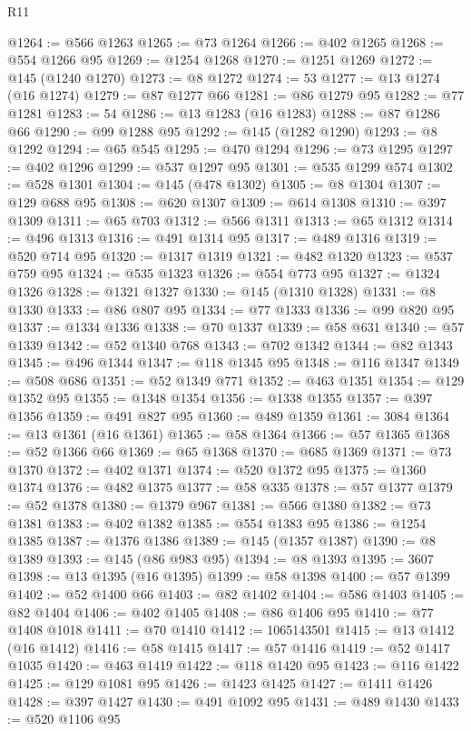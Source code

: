 \begin{lexlean}{R11}
\begin{coremodule}
@1264 := @566 @1263
@1265 := @73 @1264
@1266 := @402 @1265
@1268 := @554 @1266 @95
@1269 := @1254 @1268
@1270 := @1251 @1269
@1272 := @145 (@1240 @1270)
@1273 := @8 @1272
@1274 := 53
@1277 := @13 @1274 (@16 @1274)
@1279 := @87 @1277 @66
@1281 := @86 @1279 @95
@1282 := @77 @1281
@1283 := 54
@1286 := @13 @1283 (@16 @1283)
@1288 := @87 @1286 @66
@1290 := @99 @1288 @95
@1292 := @145 (@1282 @1290)
@1293 := @8 @1292
@1294 := @65 @545
@1295 := @470 @1294
@1296 := @73 @1295
@1297 := @402 @1296
@1299 := @537 @1297 @95
@1301 := @535 @1299 @574
@1302 := @528 @1301
@1304 := @145 (@478 @1302)
@1305 := @8 @1304
@1307 := @129 @688 @95
@1308 := @620 @1307
@1309 := @614 @1308
@1310 := @397 @1309
@1311 := @65 @703
@1312 := @566 @1311
@1313 := @65 @1312
@1314 := @496 @1313
@1316 := @491 @1314 @95
@1317 := @489 @1316
@1319 := @520 @714 @95
@1320 := @1317 @1319
@1321 := @482 @1320
@1323 := @537 @759 @95
@1324 := @535 @1323
@1326 := @554 @773 @95
@1327 := @1324 @1326
@1328 := @1321 @1327
@1330 := @145 (@1310 @1328)
@1331 := @8 @1330
@1333 := @86 @807 @95
@1334 := @77 @1333
@1336 := @99 @820 @95
@1337 := @1334 @1336
@1338 := @70 @1337
@1339 := @58 @631
@1340 := @57 @1339
@1342 := @52 @1340 @768
@1343 := @702 @1342
@1344 := @82 @1343
@1345 := @496 @1344
@1347 := @118 @1345 @95
@1348 := @116 @1347
@1349 := @508 @686
@1351 := @52 @1349 @771
@1352 := @463 @1351
@1354 := @129 @1352 @95
@1355 := @1348 @1354
@1356 := @1338 @1355
@1357 := @397 @1356
@1359 := @491 @827 @95
@1360 := @489 @1359
@1361 := 3084
@1364 := @13 @1361 (@16 @1361)
@1365 := @58 @1364
@1366 := @57 @1365
@1368 := @52 @1366 @66
@1369 := @65 @1368
@1370 := @685 @1369
@1371 := @73 @1370
@1372 := @402 @1371
@1374 := @520 @1372 @95
@1375 := @1360 @1374
@1376 := @482 @1375
@1377 := @58 @335
@1378 := @57 @1377
@1379 := @52 @1378
@1380 := @1379 @967
@1381 := @566 @1380
@1382 := @73 @1381
@1383 := @402 @1382
@1385 := @554 @1383 @95
@1386 := @1254 @1385
@1387 := @1376 @1386
@1389 := @145 (@1357 @1387)
@1390 := @8 @1389
@1393 := @145 (@86 @983 @95)
@1394 := @8 @1393
@1395 := 3607
@1398 := @13 @1395 (@16 @1395)
@1399 := @58 @1398
@1400 := @57 @1399
@1402 := @52 @1400 @66
@1403 := @82 @1402
@1404 := @586 @1403
@1405 := @82 @1404
@1406 := @402 @1405
@1408 := @86 @1406 @95
@1410 := @77 @1408 @1018
@1411 := @70 @1410
@1412 := 1065143501
@1415 := @13 @1412 (@16 @1412)
@1416 := @58 @1415
@1417 := @57 @1416
@1419 := @52 @1417 @1035
@1420 := @463 @1419
@1422 := @118 @1420 @95
@1423 := @116 @1422
@1425 := @129 @1081 @95
@1426 := @1423 @1425
@1427 := @1411 @1426
@1428 := @397 @1427
@1430 := @491 @1092 @95
@1431 := @489 @1430
@1433 := @520 @1106 @95

\end{coremodule}
\end{lexlean}
